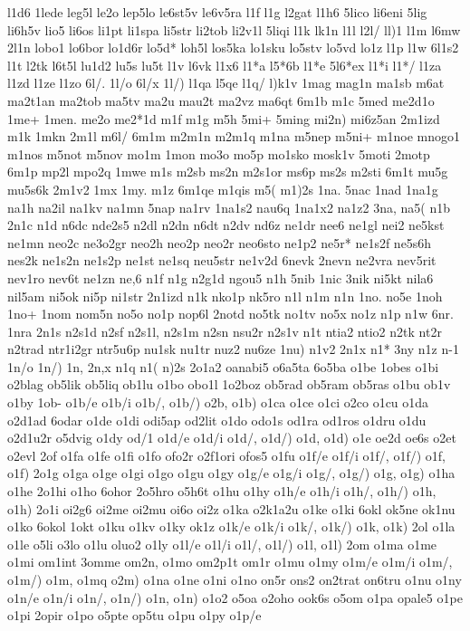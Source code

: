 {{l1d6
1lede
leg5l
le2o
lep5lo
le6st5v
le6v5ra
l1f
l1g
l2gat
l1h6
5lico
li6eni
5lig
li6h5v
lio5
li6os
li1pt
li1spa
li5str
li2tob
li2v1l
5liqi
l1k
lk1n
l1l
l2l/
ll)1
l1m
l6mw
2l1n
lobo1
lo6bor
lo1d6r
lo5d*
loh5l
los5ka
lo1sku
lo5stv
lo5vd
lo1z
l1p
l1w
6l1s2
l1t
l2tk
l6t5l
lu1d2
lu5s
lu5t
l1v
l6vk
l1x6
l1*a
l5*6b
l1*e
5l6*ex
l1*i
l1*/
l1za
l1zd
l1ze
l1zo
6l/.
1l/o
6l/x
1l/)
l1qa
l5qe
l1q/
l)k1v
1mag
mag1n
ma1sb
m6at
ma2t1an
ma2tob
ma5tv
ma2u
mau2t
ma2vz
ma6qt
6m1b
m1c
5med
me2d1o
1me+
1men.
me2o
me2*1d
m1f
m1g
m5h
5mi+
5ming
mi2n)
mi6z5an
2m1izd
m1k
1mkn
2m1l
m6l/
6m1m
m2m1n
m2m1q
m1na
m5nep
m5ni+
m1noe
mnogo1
m1nos
m5not
m5nov
mo1m
1mon
mo3o
mo5p
mo1sko
mosk1v
5moti
2motp
6m1p
mp2l
mpo2q
1mwe
m1s
m2sb
ms2n
m2s1or
ms6p
ms2s
m2sti
6m1t
mu5g
mu5s6k
2m1v2
1mx
1my.
m1z
6m1qe
m1qis
m5(
m1)2s
1na.
5nac
1nad
1na1g
na1h
na2il
na1kv
na1mn
5nap
na1rv
1na1s2
nau6q
1na1x2
na1z2
3na,
na5(
n1b
2n1c
n1d
n6dc
nde2s5
n2dl
n2dn
n6dt
n2dv
nd6z
ne1dr
nee6
ne1gl
nei2
ne5kst
ne1mn
neo2c
ne3o2gr
neo2h
neo2p
neo2r
neo6sto
ne1p2
ne5r*
ne1s2f
ne5s6h
nes2k
ne1s2n
ne1s2p
ne1st
ne1sq
neu5str
ne1v2d
6nevk
2nevn
ne2vra
nev5rit
nev1ro
nev6t
ne1zn
ne,6
n1f
n1g
n2g1d
ngou5
n1h
5nib
1nic
3nik
ni5kt
nila6
nil5am
ni5ok
ni5p
ni1str
2n1izd
n1k
nko1p
nk5ro
n1l
n1m
n1n
1no.
no5e
1noh
1no+
1nom
nom5n
no5o
no1p
nop6l
2notd
no5tk
no1tv
no5x
no1z
n1p
n1w
6nr.
1nra
2n1s
n2s1d
n2sf
n2s1l,
n2s1m
n2sn
nsu2r
n2s1v
n1t
ntia2
ntio2
n2tk
nt2r
n2trad
ntr1i2gr
ntr5u6p
nu1sk
nu1tr
nuz2
nu6ze
1nu)
n1v2
2n1x
n1*
3ny
n1z
n-1
1n/o
1n/)
1n,
2n,x
n1q
n1(
n)2s
2o1a2
oanabi5
o6a5ta
6o5ba
o1be
1obes
o1bi
o2blag
ob5lik
ob5liq
ob1lu
o1bo
obo1l
1o2boz
ob5rad
ob5ram
ob5ras
o1bu
ob1v
o1by
1ob-
o1b/e
o1b/i
o1b/,
o1b/)
o2b,
o1b)
o1ca
o1ce
o1ci
o2co
o1cu
o1da
o2d1ad
6odar
o1de
o1di
odi5ap
od2lit
o1do
odo1s
od1ra
od1ros
o1dru
o1du
o2d1u2r
o5dvig
o1dy
od/1
o1d/e
o1d/i
o1d/,
o1d/)
o1d,
o1d)
o1e
oe2d
oe6s
o2et
o2evl
2of
o1fa
o1fe
o1fi
o1fo
ofo2r
o2f1ori
ofos5
o1fu
o1f/e
o1f/i
o1f/,
o1f/)
o1f,
o1f)
2o1g
o1ga
o1ge
o1gi
o1go
o1gu
o1gy
o1g/e
o1g/i
o1g/,
o1g/)
o1g,
o1g)
o1ha
o1he
2o1hi
o1ho
6ohor
2o5hro
o5h6t
o1hu
o1hy
o1h/e
o1h/i
o1h/,
o1h/)
o1h,
o1h)
2o1i
oi2g6
oi2me
oi2mu
oi6o
oi2z
o1ka
o2k1a2u
o1ke
o1ki
6okl
ok5ne
ok1nu
o1ko
6okol
1okt
o1ku
o1kv
o1ky
ok1z
o1k/e
o1k/i
o1k/,
o1k/)
o1k,
o1k)
2ol
o1la
o1le
o5li
o3lo
o1lu
oluo2
o1ly
o1l/e
o1l/i
o1l/,
o1l/)
o1l,
o1l)
2om
o1ma
o1me
o1mi
om1int
3omme
om2n,
o1mo
om2p1t
om1r
o1mu
o1my
o1m/e
o1m/i
o1m/,
o1m/)
o1m,
o1mq
o2m)
o1na
o1ne
o1ni
o1no
on5r
ons2
on2trat
on6tru
o1nu
o1ny
o1n/e
o1n/i
o1n/,
o1n/)
o1n,
o1n)
o1o2
o5oa
o2oho
ook6s
o5om
o1pa
opale5
o1pe
o1pi
2opir
o1po
o5pte
op5tu
o1pu
o1py
o1p/e
}}
